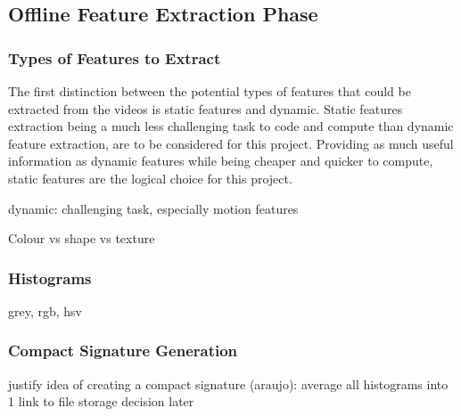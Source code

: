 \subsection{Offline Feature Extraction Phase}
\label{sec:design-offline-feature-extraction}

\subsubsection{Types of Features to Extract}

The first distinction between the potential types of features that could be extracted from the videos is static features and dynamic. Static features extraction being a much less challenging task to code and compute than dynamic feature extraction, are to be considered for this project. Providing as much useful information as dynamic features while being cheaper and quicker to compute, static features are the logical choice for this project.

dynamic: challenging task, especially motion features

Colour vs shape vs texture

\subsubsection{Histograms}

grey, rgb, hsv

\subsubsection{Compact Signature Generation}

justify idea of creating a compact signature (araujo): average all histograms into 1
link to file storage decision later

